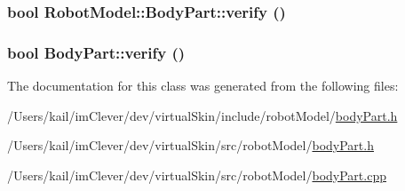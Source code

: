 \hypertarget{class_robot_model_1_1_body_part_a9aac03ba60f71274d0b79af69629eb86}{
\subsubsection[{verify}]{\setlength{\rightskip}{0pt plus 5cm}bool RobotModel::BodyPart::verify ()}}
\label{class_robot_model_1_1_body_part_a9aac03ba60f71274d0b79af69629eb86}
\hypertarget{class_robot_model_1_1_body_part_a6b52676f58b9da5bef87ef2fac1a7a94}{
\subsubsection[{verify}]{\setlength{\rightskip}{0pt plus 5cm}bool BodyPart::verify ()}}
\label{class_robot_model_1_1_body_part_a6b52676f58b9da5bef87ef2fac1a7a94}


The documentation for this class was generated from the following files:\begin{DoxyCompactItemize}
\item 
/Users/kail/imClever/dev/virtualSkin/include/robotModel/\hyperlink{include_2robot_model_2body_part_8h}{bodyPart.h}\item 
/Users/kail/imClever/dev/virtualSkin/src/robotModel/\hyperlink{src_2robot_model_2body_part_8h}{bodyPart.h}\item 
/Users/kail/imClever/dev/virtualSkin/src/robotModel/\hyperlink{body_part_8cpp}{bodyPart.cpp}\end{DoxyCompactItemize}
